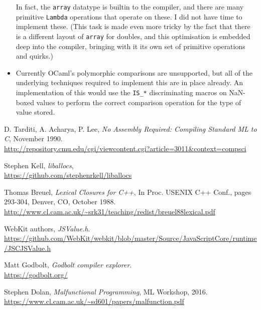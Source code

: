 \documentclass[12pt,a4paper,twoside,openright]{report}
\begin{document}
\begin{itemize}
      In fact, the \lstinline!array! datatype is builtin to the compiler, and there
      are many primitive \lstinline!Lambda! operations that operate on these.
      I did not have time to implement these. (This task is made even more tricky by
      the fact that there is a different layout of \lstinline!array! for doubles,
      and this optimisation is embedded deep into the compiler, bringing with it
      its own set of primitive operations and quirks.)
  \item Currently OCaml's polymorphic comparisons are unsupported, but all of the
      underlying techniques required to implement this are in place already. An
      implementation of this would use the \lstinline!IS_*! discriminating
      macros on NaN-boxed values to perform the correct comparison operation for
      the type of value stored.
\end{itemize}


\begin{thebibliography}{1}

  D. Tarditi, A. Acharya, P. Lee,
  \emph{No Assembly Required: Compiling Standard ML to C},
  November 1990. \\ \url{http://repository.cmu.edu/cgi/viewcontent.cgi?article=3011&context=compsci}

  Stephen Kell,
  \emph{liballocs},
  \\ \url{https://github.com/stephenrkell/liballocs}

  Thomas Breuel,
  \emph{Lexical Closures for C++},
  In Proc. USENIX C++ Conf., pages 293-304,
  Denver, CO, October 1988.  \\ \url{http://www.cl.cam.ac.uk/~srk31/teaching/redist/breuel88lexical.pdf}

  WebKit authors,
  \emph{JSValue.h}.
  \\ \url{https://github.com/WebKit/webkit/blob/master/Source/JavaScriptCore/runtime/JSCJSValue.h}

  Matt Godbolt,
  \emph{Godbolt compiler explorer}.
  \\ \url{https://godbolt.org/}

  Stephen Dolan,
  \emph{Malfunctional Programming},
  ML Workshop, 2016.  \\ \url{https://www.cl.cam.ac.uk/~sd601/papers/malfunction.pdf}

\end{thebibliography}
\end{document}
